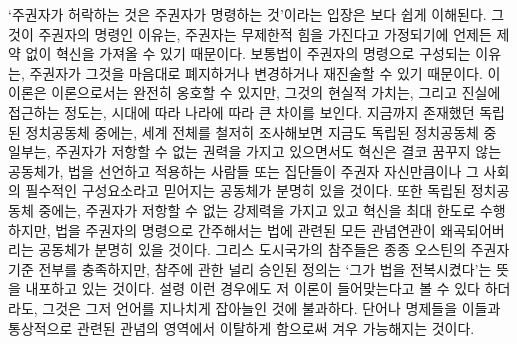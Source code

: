 `주권자가 허락하는 것은 주권자가 명령하는 것'이라는 입장은 보다 쉽게 이해된다.
그것이 주권자의 명령인 이유는,
주권자는
무제한적 힘을 가진다고 가정되기에
언제든 제약 없이 혁신을
가져올 수 있기 때문이다.
보통법이 주권자의 명령으로 구성되는 이유는,
주권자가
그것을
마음대로
폐지하거나 변경하거나 재진술할 수 있기 때문이다.
이 이론은 이론으로서는 완전히 옹호할 수 있지만,
그것의 현실적 가치는, 그리고 진실에 접근하는 정도는,
시대에 따라 나라에 따라 큰 차이를 보인다.
지금까지 존재했던 독립된 정치공동체 중에는,
세계 전체를 철저히 조사해보면 지금도 독립된 정치공동체 중 일부는,
주권자가 저항할 수 없는 권력을 가지고 있으면서도
혁신은 결코 꿈꾸지 않는 공동체가,
법을 선언하고 적용하는 사람들 또는 집단들이
주권자 자신만큼이나 그 사회의 필수적인 구성요소라고 믿어지는 공동체가
분명히 있을 것이다.
또한 독립된 정치공동체 중에는,
주권자가 저항할 수 없는 강제력을 가지고 있고
혁신을 최대 한도로 수행하지만,
법을 주권자의 명령으로 간주해서는
법에 관련된 모든 관념연관이 왜곡되어버리는 공동체가
분명히 있을 것이다.
그리스 도시국가의 참주들은 종종 오스틴의 주권자 기준 전부를 충족하지만,
참주에 관한 널리 승인된 정의는 `그가 법을 전복시켰다'는 뜻을 내포하고
있는 것이다.
설령 이런 경우에도 저 이론이 들어맞는다고 볼 수 있다 하더라도,
그것은 그저 언어를 지나치게 잡아늘인 것에 불과하다.
단어나 명제들을 이들과 통상적으로 관련된 관념의 영역에서 이탈하게 함으로써
겨우 가능해지는 것이다.

